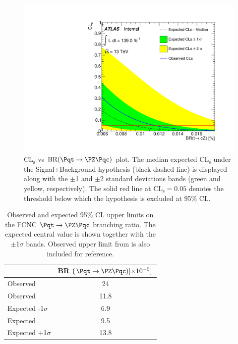 \begin{figure}[htbp]
	\centering
	\includegraphics[width=.585\textwidth]{Chapters/CH8/figures/SPLUSB_CRSR_DL1rc_unblind/CLsPlot}
	\caption{$\mathrm{CL_{s}}$ vs $\mathrm{BR (\Pqt\rightarrow\PZ\Pqc)}$ plot. The median expected $\mathrm{CL_{s}}$ under the Signal+Background hypothesis
(black dashed line) is displayed along with the $\pm$1 and $\pm$2 standard deviations bands
(green and yellow, respectively). The solid red line at $\mathrm{CL_{s}= 0.05}$ denotes the threshold below
which the hypothesis is excluded at 95\% CL.}
	\label{fig:stat:tzc:splusb:crsr:CLsPlot}
\end{figure}
\begin{table}[htbp]
	\centering
	\begin{tabular}{lc} 
		\toprule
		 								& BR ($\Pqt\rightarrow\PZ\Pqc) [\times 10^{-5}]$  \\
		\midrule
		Observed \cite{TOPQ-2017-06} 	 & 24 \\
		Observed  				   					& 11.8  \\
		Expected -1$\sigma$   				  &   6.9 \\
		Expected                    				&  9.5 \\
	    Expected +1$\sigma$  				 &  13.8 \\		
		\bottomrule
	\end{tabular}
	\caption{
		Observed and expected 95\% CL upper limits on the FCNC $\Pqt\rightarrow\PZ\Pqc$ branching ratio. 
		The expected central value is shown together with the $\pm$1$\sigma$ bands.
		Observed upper limit from \cite{TOPQ-2017-06} is also included for reference.
	}%
	\label{tab:results:limits_unb}
\end{table}

